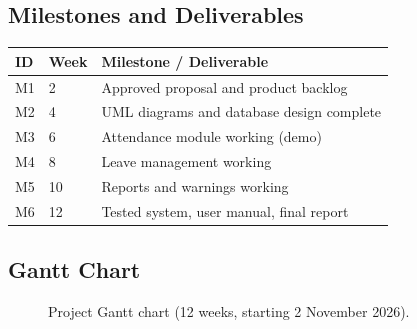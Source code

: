\documentclass[11pt,a4paper]{article}
\begin{document}
\subsection{Milestones and Deliverables}
\begin{tabularx}{\textwidth}{|l|l|X|}
\hline
\textbf{ID} & \textbf{Week} & \textbf{Milestone / Deliverable}\\
\hline
M1 & 2 & Approved proposal and product backlog\\ \hline
M2 & 4 & UML diagrams and database design complete\\ \hline
M3 & 6 & Attendance module working (demo)\\ \hline
M4 & 8 & Leave management working\\ \hline
M5 & 10 & Reports and warnings working\\ \hline
M6 & 12 & Tested system, user manual, final report\\
\hline
\end{tabularx}

\subsection{Gantt Chart}
\begin{figure}[H]
\centering
{}
\caption{Project Gantt chart (12 weeks, starting 2 November 2026).}
\end{figure}
\end{document}
